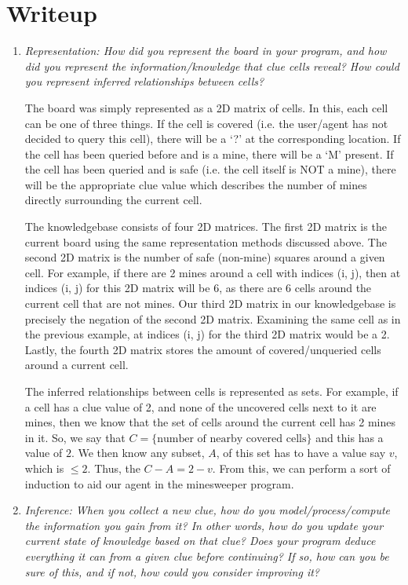 \documentclass[12pt, twoside]{article}
\begin{document}
\section{Writeup}
\begin{enumerate}[itemsep=2mm,parsep=4mm]
    \item 
        \textit{Representation: How did you represent the board in your program, and how did you represent the information/knowledge that clue cells reveal? How could you represent inferred relationships between cells?}
    
        The board was simply represented as a 2D matrix of cells. In this, each cell can be one of three things. If the cell is covered (i.e. the user/agent has not decided to query this cell), there will be a `?' at the corresponding location. If the cell has been queried before and is a mine, there will be a `M' present. If the cell has been queried and is safe (i.e. the cell itself is NOT a mine), there will be the appropriate clue value which describes the number of mines directly surrounding the current cell. 

        The knowledgebase consists of four 2D matrices. The first 2D matrix is the current board using the same representation methods discussed above. The second 2D matrix is the number of safe (non-mine) squares around a given cell. For example, if there are 2 mines around a cell with indices (i, j), then at indices (i, j) for this 2D matrix will be 6, as there are 6 cells around the current cell that are not mines. Our third 2D matrix in our knowledgebase is precisely the negation of the second 2D matrix. Examining the same cell as in the previous example, at indices (i, j) for the third 2D matrix would be a 2. Lastly, the fourth 2D matrix stores the amount of covered/unqueried cells around a current cell.

        The inferred relationships between cells is represented as sets. For example, if a cell has a clue value of 2, and none of the uncovered cells next to it are mines, then we know that the set of cells around the current cell has 2 mines in it. So, we say that $C = \{\text{number of nearby covered cells}\}$ and this has a value of $2$. We then know any subset, $A$, of this set has to have a value say $v$, which is $\leq 2$. Thus, the $C - A = 2 - v$. From this, we can perform a sort of induction to aid our agent in the minesweeper program.

        \vfill
        \pagebreak

    \item 
        \textit{Inference: When you collect a new clue, how do you model/process/compute the information you gain from it? In other words, how do you update your current state of knowledge based on that clue? Does your program deduce everything it can from a given clue before continuing? If so, how can you be sure of this, and if not, how could you consider improving it?}


\end{enumerate}
\end{document}

